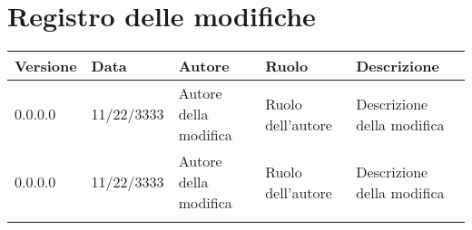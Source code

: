 \section*{\hfil Registro delle modifiche \hfil}
{
	\renewcommand{\arraystretch}{1}
	\centering
	\setlength{\aboverulesep}{0pt}
	\setlength{\belowrulesep}{0pt}
	\begin{longtable}{C{2cm} C{2.28cm} C{3cm} C{3cm} C{3cm}}
		\toprule 
		\textbf{Versione} & \textbf{Data} & \textbf{Autore} & \textbf{Ruolo} & \textbf{Descrizione}\\
		\toprule
		\endhead
		 
		0.0.0.0 & 11/22/3333 & Autore della modifica & Ruolo dell'autore & Descrizione della modifica \\
		0.0.0.0 & 11/22/3333 & Autore della modifica & Ruolo dell'autore & Descrizione della modifica \\
		
		\bottomrule
		\hiderowcolors
	\end{longtable}
}
